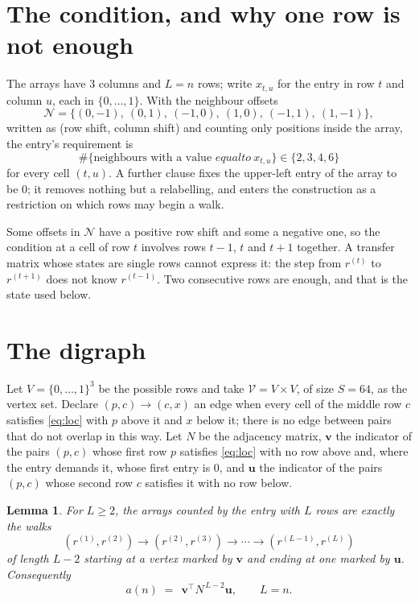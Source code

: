 \documentclass[11pt,a4paper]{article}
\theoremstyle{plain}
\newtheorem{lemma}[theorem]{Lemma}
\theoremstyle{definition}
\begin{document}
\section{The condition, and why one row is not enough}

The arrays have $3$ columns and $L=n$ rows; write $x_{t,u}$ for the entry in
row $t$ and column $u$, each in $\{0,\dots,1\}$. With the neighbour offsets
\[
\mathcal N=\{(0,-1),\ (0,1),\ (-1,0),\ (1,0),\ (-1,1),\ (1,-1)\},
\]
written as (row shift, column shift) and counting only positions inside the array, the
entry's requirement is
\begin{equation}\label{eq:loc}
\#\{\text{neighbours with a value }equal to\ x_{t,u}\}\in\{2,3,4,6\}
\end{equation}
for every cell $(t,u)$. A further clause fixes the upper-left entry of the array to be $0$; it removes nothing but a relabelling, and enters the construction as a restriction on which rows may begin a walk.

Some offsets in $\mathcal N$ have a positive row shift and some a negative one, so the
condition at a cell of row $t$ involves rows $t-1$, $t$ and $t+1$ together. A transfer
matrix whose states are single rows cannot express it: the step from $r^{(t)}$ to
$r^{(t+1)}$ does not know $r^{(t-1)}$. Two consecutive rows are enough, and that is
the state used below.

\section{The digraph}

Let $V=\{0,\dots,1\}^{3}$ be the possible rows and take
$\mathcal V=V\times V$, of size $S=64$, as the vertex set. Declare $(p,c)\to(c,x)$ an edge
when every cell of the middle row $c$ satisfies \eqref{eq:loc} with $p$ above it and $x$
below it; there is no edge between pairs that do not overlap in this way. Let $N$ be the
adjacency matrix, $\mathbf{v}$ the indicator of the pairs $(p,c)$ whose first row $p$
satisfies \eqref{eq:loc} with no row above and, where the entry demands it, whose first entry is $0$, and $\mathbf{u}$ the indicator of
the pairs $(p,c)$ whose second row $c$ satisfies it with no row below.

\begin{lemma}\label{lem:walk}
For $L\ge2$, the arrays counted by the entry with $L$ rows are exactly the walks
\[
(r^{(1)},r^{(2)})\to(r^{(2)},r^{(3)})\to\cdots\to(r^{(L-1)},r^{(L)})
\]
of length $L-2$ starting at a vertex marked by $\mathbf{v}$ and ending at one marked by
$\mathbf{u}$. Consequently
\[
a(n)\;=\;\,\mathbf{v}^{\!\top}N^{\,L-2}\mathbf{u},\qquad L=n .
\]
\end{lemma}
\end{document}
